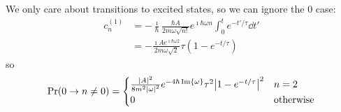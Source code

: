 \documentclass[a4paper,twoside]{article}
\begin{document}
\begin{problem}
   We only care about transitions to excited states, so we can ignore the $ 0 $ case:
   \begin{align}
       c_n^{(1)} &= - \frac{\imath}{\hbar} \frac{\hbar A}{2m \omega \sqrt{n!}} e^{\imath \hbar \omega n} \int_0^t e^{-t' / \tau} \dd{t'} \\
       &= - \frac{\imath A e^{\imath \hbar \omega 2}}{2m \omega \sqrt{2}} \tau \left( 1 - e^{-t / \tau} \right)
   \end{align}
   so
   \begin{equation}
       \Pr(0 \to n \neq 0) = \begin{cases} \frac{\abs{A}^2}{8m^2 \abs{\omega}^2} e^{-4 \hbar \Im{\omega}} \tau^2 \abs{1- e^{-t / \tau}}^2 & n = 2 \\ 0 & \text{otherwise} \end{cases}
   \end{equation}
\end{problem}
\end{document}
